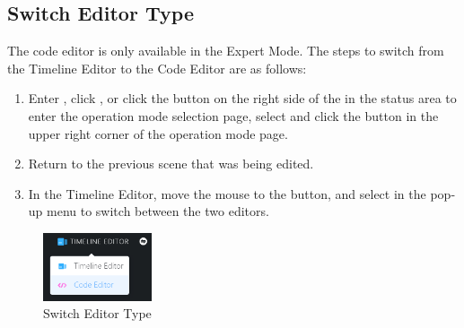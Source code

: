 

\clearpage

\subsection{Switch Editor Type}

The code editor is only available in the Expert Mode. The steps to switch from the Timeline Editor to the Code Editor are as follows:
\begin{enumerate}
\item Enter , click , or click the \colorbox{Black}{} button on the right side of the  in the status area to enter the operation mode selection page, select  and click the  button in the upper right corner of the operation mode page.
\item Return to the previous scene that was being edited.
\item In the Timeline Editor, move the mouse to the  button, and select  in the pop­up menu to switch between the two editors.
\end{enumerate}

\begin{figure}[H]
	\centering
	\includegraphics[height=2cm]{en/image/3-3.png}
	\caption{Switch Editor Type}
	\label{fig:切换编辑器类型}
\end{figure}


\vfill

\clearpage


